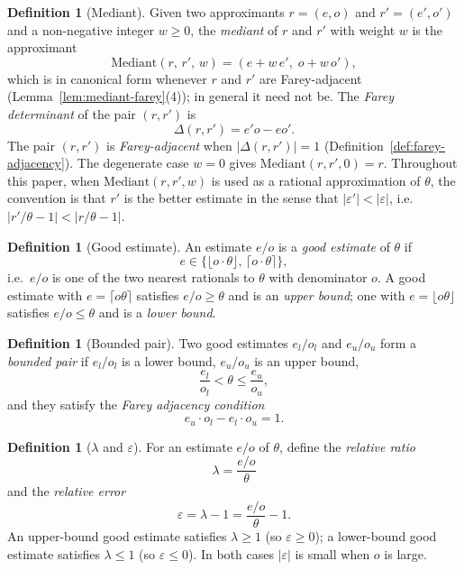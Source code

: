 \documentclass[12pt]{article}
\theoremstyle{definition}
\newtheorem{definition}[theorem]{Definition}
\theoremstyle{remark}
\theoremstyle{plain}
\newcommand{\lam}{\lambda}
\newcommand{\eps}{\varepsilon}
\begin{document}
\begin{definition}[Mediant]
\label{def:mediant}
Given two approximants $r = (e, o)$ and $r' = (e', o')$ and a non-negative integer $w \geq 0$,
the \emph{mediant} of $r$ and $r'$ with weight $w$ is the approximant
\[
  \mathrm{Mediant}(r,\, r',\, w) = (e + w\,e',\; o + w\,o'),
\]
which is in canonical form whenever $r$ and $r'$ are Farey-adjacent
(Lemma~\ref{lem:mediant-farey}(4)); in general it need not be.
The \emph{Farey determinant} of the pair $(r, r')$ is
\[
  \Delta(r, r') = e' o - e o'.
\]
The pair $(r, r')$ is \emph{Farey-adjacent} when $|\Delta(r, r')| = 1$
(Definition~\ref{def:farey-adjacency}).
The degenerate case $w = 0$ gives $\mathrm{Mediant}(r, r', 0) = r$.
Throughout this paper, when $\mathrm{Mediant}(r, r', w)$ is used as a rational
approximation of $\theta$, the convention is that $r'$ is the better estimate
in the sense that $|\eps'| < |\eps|$, i.e.\ $|r'/\theta - 1| < |r/\theta - 1|$.
\end{definition}

\begin{definition}[Good estimate]
\label{def:good-estimate}
An estimate $e/o$ is a \emph{good estimate} of $\theta$ if
\[
  e \in \{\lfloor o \cdot \theta \rfloor,\, \lceil o \cdot \theta \rceil\},
\]
i.e.\ $e/o$ is one of the two nearest rationals to $\theta$ with denominator $o$.
A good estimate with $e = \lceil o\theta \rceil$ satisfies $e/o \geq \theta$ and is an
\emph{upper bound}; one with $e = \lfloor o\theta \rfloor$ satisfies $e/o \leq \theta$
and is a \emph{lower bound}.
\end{definition}

\begin{definition}[Bounded pair]
\label{def:bounded-pair}
Two good estimates $e_l/o_l$ and $e_u/o_u$ form a \emph{bounded pair} if
$e_l/o_l$ is a lower bound, $e_u/o_u$ is an upper bound,
\[
  \frac{e_l}{o_l} < \theta \leq \frac{e_u}{o_u},
\]
and they satisfy the \emph{Farey adjacency condition}
\[
  e_u \cdot o_l - e_l \cdot o_u = 1.
\]
\end{definition}

\begin{definition}[$\lambda$ and $\varepsilon$]
\label{def:lambda-eps}
For an estimate $e/o$ of $\theta$, define the \emph{relative ratio}
\[
  \lam = \frac{e/o}{\theta}
\]
and the \emph{relative error}
\[
  \eps = \lam - 1 = \frac{e/o}{\theta} - 1.
\]
An upper-bound good estimate satisfies $\lam \geq 1$ (so $\eps \geq 0$);
a lower-bound good estimate satisfies $\lam \leq 1$ (so $\eps \leq 0$).
In both cases $|\eps|$ is small when $o$ is large.
\end{definition}
\end{document}
